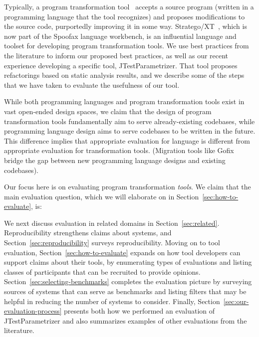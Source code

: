 Typically, a program
transformation tool~\cite{visser04:_progr_trans} accepts a source program (written in a programming
language that the tool recognizes) and proposes modifications to the source code,
purportedly improving it in some way. Stratego/XT~\cite{bravenboer08:_strat_xt},
which is now part of the Spoofax language workbench, is an influential language
and toolset for developing program transformation tools.
We use best practices from the literature
to inform our proposed best practices, as well as our recent experience developing
a specific tool, JTestParametrizer. That tool proposes
refactorings based on static analysis results, and we describe some of the
steps that we have taken to evaluate the usefulness of our tool.

While both programming languages and program transformation tools exist
in vast open-ended design spaces, we claim that the design of program transformation
tools fundamentally aim to serve already-existing codebases, while programming 
language design aims to serve codebases to be written in the future.
This difference implies that appropriate evaluation for language is different 
from appropriate evaluation for transformation tools.
(Migration tools like Gofix~\cite{cox11:_introd_gofix} bridge the gap between new programming language designs
and existing codebases).

Our focus here is on evaluating program transformation \emph{tools}.
We claim that the main evaluation question, which we will elaborate on in Section~\ref{sec:how-to-evaluate}, is:

\begin{center}
\end{center}

We next discuss evaluation in related domains in Section~\ref{sec:related}.
Reproducibility strengthens claims about systems, and Section~\ref{sec:reproducibility}
surveys reproducibility. Moving on to tool evaluation, Section~\ref{sec:how-to-evaluate} 
expands on how tool developers can support claims about their tools, by enumerating
types of evaluations and listing classes of participants that can be recruited to
provide opinions. Section~\ref{sec:selecting-benchmarks} completes the evaluation picture
by surveying sources of systems that can serve as benchmarks and listing filters
that may be helpful in reducing the number of systems to consider. Finally, 
Section~\ref{sec:our-evaluation-process} presents both how we performed an evaluation of 
JTestParametrizer and also summarizes examples of other evaluations from the literature.


